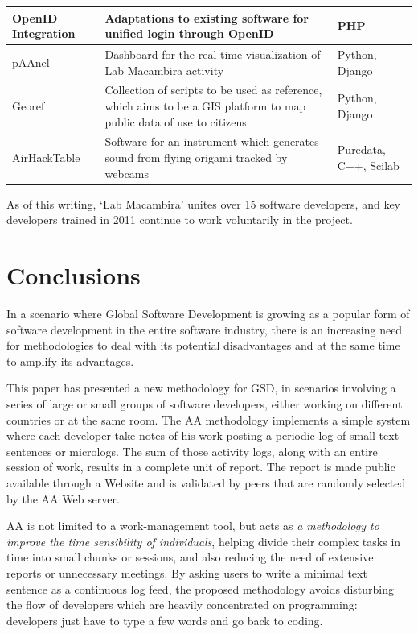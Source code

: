 \documentclass{article}
\begin{document}
\begin{table}
{\begin{tabular}{|l|p{5cm}|l|}
        \hline
        OpenID Integration & Adaptations to existing software for
        unified login through OpenID & PHP \\
        \hline
        pAAnel & Dashboard for the real-time visualization of Lab
        Macambira activity & Python, Django \\
        \hline
        Georef & Collection of scripts to be used as reference, which
        aims to be a GIS platform to map public data of use to
        citizens & Python, Django \\
        \hline
        AirHackTable & Software for an instrument which generates
        sound from flying origami tracked by webcams & Puredata,
        C++, Scilab \\
        \hline
        \end{tabular}}
    \label{tabela:criados}
\end{table}

As of this writing, `Lab Macambira' unites over 15 software developers, and 
key developers trained in 2011 continue to work voluntarily in the project.

\section{Conclusions}
\label{conclusions}

In a scenario where Global Software Development is growing as a popular form of
software development in the entire software industry, there is an increasing
need for methodologies to deal with its potential disadvantages and at the same
time to amplify its advantages.

This paper has presented a new methodology for GSD, in scenarios
involving a series of large or small groups of software developers, either working on
different countries or at the same room. The AA methodology
implements a simple system where each developer take notes of his work
posting a periodic log of small text sentences or micrologs. The sum of those
activity logs, along with an entire session of work, results in a complete
unit of report. The report is made public available through a Website and is
validated by peers that are randomly selected by the AA Web server.

AA is not limited to a work-management tool, but acts as \emph{a
methodology to improve the time sensibility of individuals}, helping divide their
complex tasks in time into small chunks or sessions, and also reducing the need
of extensive reports or unnecessary meetings. By asking users to write a minimal
text sentence as a continuous log feed, the proposed methodology avoids
disturbing the flow of developers which are heavily concentrated on programming:
developers just have to type a few words and go back to coding.
\end{document}
